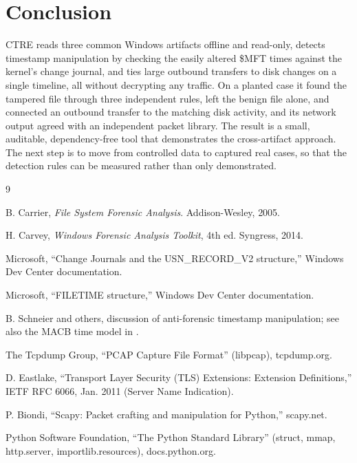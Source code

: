 \documentclass[12pt,onecolumn]{IEEEtran}
\begin{document}
\section{Conclusion}
CTRE reads three common Windows artifacts offline and read-only, detects timestamp manipulation by checking the easily altered \$MFT times against the kernel's change journal, and ties large outbound transfers to disk changes on a single timeline, all without decrypting any traffic. On a planted case it found the tampered file through three independent rules, left the benign file alone, and connected an outbound transfer to the matching disk activity, and its network output agreed with an independent packet library. The result is a small, auditable, dependency-free tool that demonstrates the cross-artifact approach. The next step is to move from controlled data to captured real cases, so that the detection rules can be measured rather than only demonstrated.

\begin{thebibliography}{9}

B. Carrier, \emph{File System Forensic Analysis}. Addison-Wesley, 2005.

H. Carvey, \emph{Windows Forensic Analysis Toolkit}, 4th ed. Syngress, 2014.

Microsoft, ``Change Journals and the USN\_RECORD\_V2 structure,'' Windows Dev Center documentation.

Microsoft, ``FILETIME structure,'' Windows Dev Center documentation.

B. Schneier and others, discussion of anti-forensic timestamp manipulation; see also the MACB time model in \cite{r1}.

The Tcpdump Group, ``PCAP Capture File Format'' (libpcap), tcpdump.org.

D. Eastlake, ``Transport Layer Security (TLS) Extensions: Extension Definitions,'' IETF RFC 6066, Jan. 2011 (Server Name Indication).

P. Biondi, ``Scapy: Packet crafting and manipulation for Python,'' scapy.net.

Python Software Foundation, ``The Python Standard Library'' (struct, mmap, http.server, importlib.resources), docs.python.org.

\end{thebibliography}
\end{document}
